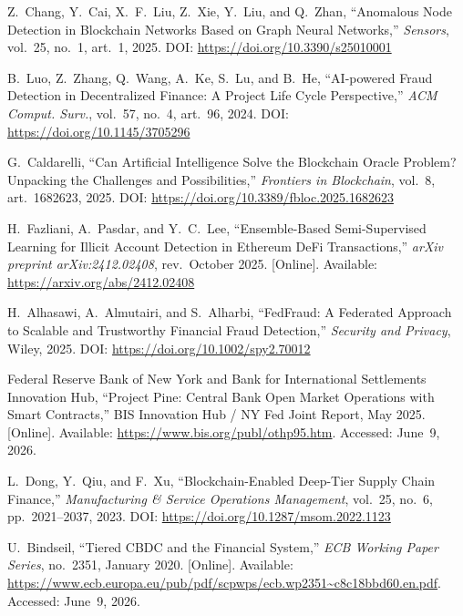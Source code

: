 \documentclass[12pt, a4paper]{report}
\begin{document}
{\begin{enumerate}[label={[\arabic*]}]
\item Z.~Chang, Y.~Cai, X.~F.~Liu, Z.~Xie, Y.~Liu, and Q.~Zhan, ``Anomalous Node Detection in Blockchain Networks Based on Graph Neural Networks,'' \textit{Sensors}, vol.~25, no.~1, art.~1, 2025. DOI: \url{https://doi.org/10.3390/s25010001}

\item B.~Luo, Z.~Zhang, Q.~Wang, A.~Ke, S.~Lu, and B.~He, ``AI-powered Fraud Detection in Decentralized Finance: A Project Life Cycle Perspective,'' \textit{ACM Comput. Surv.}, vol.~57, no.~4, art.~96, 2024. DOI: \url{https://doi.org/10.1145/3705296}

\item G.~Caldarelli, ``Can Artificial Intelligence Solve the Blockchain Oracle Problem? Unpacking the Challenges and Possibilities,'' \textit{Frontiers in Blockchain}, vol.~8, art.~1682623, 2025. DOI: \url{https://doi.org/10.3389/fbloc.2025.1682623}

\item H.~Fazliani, A.~Pasdar, and Y.~C.~Lee, ``Ensemble-Based Semi-Supervised Learning for Illicit Account Detection in Ethereum DeFi Transactions,'' \textit{arXiv preprint arXiv:2412.02408}, rev.~October 2025. [Online]. Available: \url{https://arxiv.org/abs/2412.02408}

\item H.~Alhasawi, A.~Almutairi, and S.~Alharbi, ``FedFraud: A Federated Approach to Scalable and Trustworthy Financial Fraud Detection,'' \textit{Security and Privacy}, Wiley, 2025. DOI: \url{https://doi.org/10.1002/spy2.70012}

\item Federal Reserve Bank of New York and Bank for International Settlements Innovation Hub, ``Project Pine: Central Bank Open Market Operations with Smart Contracts,'' BIS Innovation Hub / NY Fed Joint Report, May 2025. [Online]. Available: \url{https://www.bis.org/publ/othp95.htm}. Accessed: June~9, 2026.

\item L.~Dong, Y.~Qiu, and F.~Xu, ``Blockchain-Enabled Deep-Tier Supply Chain Finance,'' \textit{Manufacturing \& Service Operations Management}, vol.~25, no.~6, pp.~2021--2037, 2023. DOI: \url{https://doi.org/10.1287/msom.2022.1123}

\item U.~Bindseil, ``Tiered CBDC and the Financial System,'' \textit{ECB Working Paper Series}, no.~2351, January 2020. [Online]. Available: \url{https://www.ecb.europa.eu/pub/pdf/scpwps/ecb.wp2351~c8c18bbd60.en.pdf}. Accessed: June~9, 2026.


\end{enumerate}}
\end{document}
